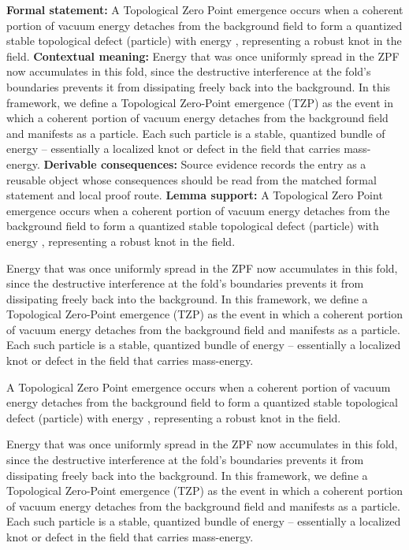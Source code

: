 \begingroup\footnotesize\setlength{\emergencystretch}{3em}\sloppy
\textbf{Formal statement:} A Topological Zero Point emergence occurs when a coherent portion of vacuum energy detaches from the background field to form a quantized stable topological defect (particle) with energy , representing a robust knot in the field.  
\textbf{Contextual meaning:} Energy that was once uniformly spread in the ZPF now accumulates in this fold, since the destructive interference at the fold's boundaries prevents it from dissipating freely back into the background. In this framework, we define a Topological Zero-Point emergence (TZP) as the event in which a coherent portion of vacuum energy detaches from the background field and manifests as a particle. Each such particle is a stable, quantized bundle of energy -- essentially a localized knot or defect in the field that carries mass-energy.
\textbf{Derivable consequences:} Source evidence records the entry as a reusable object whose consequences should be read from the matched formal statement and local proof route.
\textbf{Lemma support:} A Topological Zero Point emergence occurs when a coherent portion of vacuum energy detaches from the background field to form a quantized stable topological defect (particle) with energy , representing a robust knot in the field.  \par
\endgroup

Energy that was once uniformly spread in the ZPF now accumulates in this fold, since the destructive interference at the fold's boundaries prevents it from dissipating freely back into the background. In this framework, we define a Topological Zero-Point emergence (TZP) as the event in which a coherent portion of vacuum energy detaches from the background field and manifests as a particle. Each such particle is a stable, quantized bundle of energy -- essentially a localized knot or defect in the field that carries mass-energy.

A Topological Zero Point emergence occurs when a coherent portion of vacuum energy detaches from the background field to form a quantized stable topological defect (particle) with energy , representing a robust knot in the field.  

Energy that was once uniformly spread in the ZPF now accumulates in this fold, since the destructive interference at the fold's boundaries prevents it from dissipating freely back into the background. In this framework, we define a Topological Zero-Point emergence (TZP) as the event in which a coherent portion of vacuum energy detaches from the background field and manifests as a particle. Each such particle is a stable, quantized bundle of energy -- essentially a localized knot or defect in the field that carries mass-energy.
\endgroup

